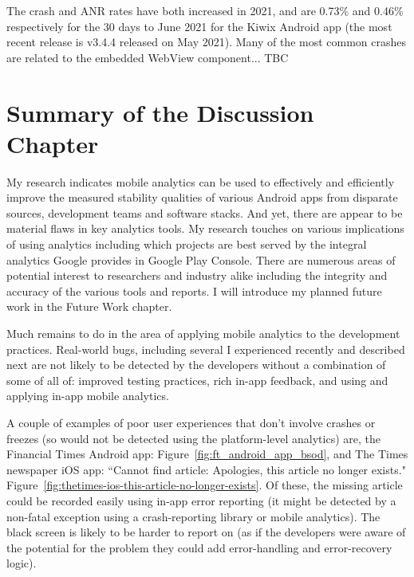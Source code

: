 The crash and ANR rates have both increased in 2021, and are 0.73\% and 0.46\% respectively for the 30 days to  June 2021 for the Kiwix Android app (the most recent release is v3.4.4 released on  May 2021). Many of the most common crashes are related to the embedded WebView component... TBC



\section{Summary of the Discussion Chapter}
My research indicates mobile analytics can be used to effectively and efficiently improve the measured stability qualities of various Android apps from disparate sources, development teams and software stacks. And yet, there are appear to be material flaws in key analytics tools. My research touches on various implications of using analytics including which projects are best served by the integral analytics Google provides in Google Play Console. There are numerous areas of potential interest to researchers and industry alike including the integrity and accuracy of the various tools and reports. I will introduce my planned future work in the Future Work chapter.


Much remains to do in the area of applying mobile analytics to the development practices. Real-world bugs, including several I experienced recently and described next are not likely to be detected by the developers without a combination of some of all of: improved testing practices, rich in-app feedback, and using and applying in-app mobile analytics.

A couple of examples of poor user experiences that don't involve crashes or freezes (so would not be detected using the platform-level analytics) are, the Financial Times Android app: Figure~\ref{fig:ft_android_app_bsod}, and The Times newspaper iOS app: ``Cannot find article: Apologies, this article no longer exists." Figure~\ref{fig:thetimes-ios-this-article-no-longer-exists}. Of these, the missing article could be recorded easily using in-app error reporting (it might be detected by a non-fatal exception using a crash-reporting library or mobile analytics). The black screen is likely to be harder to report on (as if the developers were aware of the potential for the problem they could add error-handling and error-recovery logic).

